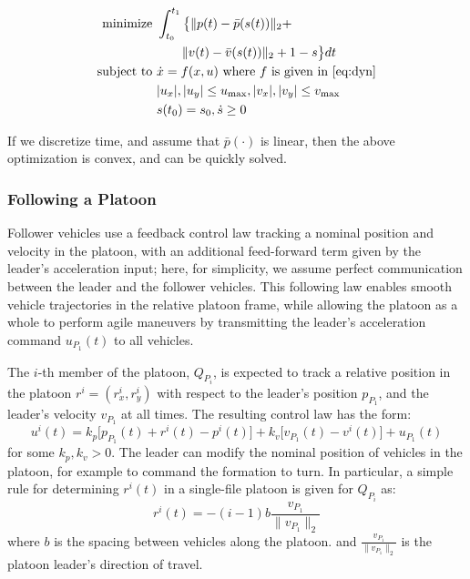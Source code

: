 \begin{equation}
\begin{aligned}
\text{minimize } & \int_{t_0}^{t_1} \big\{\| p(t)-\bar{p}(s(t)) \|_2 + \\ 
&\qquad \| v(t) - \bar{v}(s(t)) \|_2 + 1-s \big\} dt \\
\text{subject to } & \dot{x} = f(x,u) \text{ where } f \text{ is given in \eqref{eq:dyn}} \\
& |u_x|, |u_y| \le u_\text{max}, |v_x|, |v_y| \le v_\text{max} \\
& s(t_0) = s_0, \dot{s} \ge 0
\end{aligned}
\end{equation}

If we discretize time, and assume that $\bar{p}(\cdot)$ is linear, then the above optimization is convex, and can be quickly solved.

\subsubsection{Following a Platoon} \label{sec:follow_platoon}
Follower vehicles use a feedback control law tracking a nominal position and velocity in the platoon, with an additional feed-forward term given by the leader's acceleration input; here, for simplicity, we assume perfect communication between the leader and the follower vehicles. This following law enables smooth vehicle trajectories in the relative platoon frame, while allowing the platoon as a whole to perform agile maneuvers by transmitting the leader's acceleration command $u_{P_1}(t)$ to all vehicles.

The $i$-th member of the platoon, $Q_{P_i}$, is expected to track a relative position in the platoon $r^i = (r_x^i,r_y^i)$ with respect to the leader's position $p_{P_1}$, and the leader's velocity $v_{P_1}$ at all times. The resulting control law has the form:
\begin{equation}\label{eq:follow}
u^i(t) = k_p \big[p_{P_1}(t) + r^i(t) - p^i(t) \big] + k_v\big[v_{P_1}(t) - v^i(t)\big] + u_{P_1}(t)
\end{equation}
for some $k_p,k_v>0$. The leader can modify the nominal position of vehicles in the platoon, for example to command the formation to turn. In particular, a simple rule for determining $r^i(t)$ in a single-file platoon is given for $Q_{P_i}$ as:
\begin{equation}\label{eq:nominal_pos}
r^i(t) = - (i-1) b \frac{v_{P_1}}{\|v_{P_1}\|_2}
\end{equation}
where $b$ is the spacing between vehicles along the platoon. and $\frac{v_{P_1}}{\|v_{P_1}\|_2}$ is the platoon leader's direction of travel.


